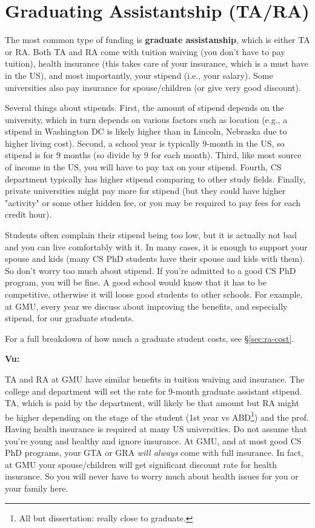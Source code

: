 \documentclass[oneside,11pt]{memoir}
\newenvironment{commentbox}[1][]{
\small
    \begin{mybox}
    {\small \textbf{#1}}
 }{
   \end{mybox}
}
\begin{document}
\section{Graduating Assistantship (TA/RA)}
The most common type of funding is \textbf{graduate assistanship}, which is either TA or RA. Both TA and RA come with tuition waiving (you don't have to pay tuition), health insurance (this takes care of your insurance, which is a must have in the US), and most importantly, your stipend (i.e., your salary). Some universities also pay insurance for spouse/children (or give very good discount).

Several things about stipends.  First, the amount of stipend depends on the university, which in turn depends on various factors such as location (e.g., a stipend in Washington DC is likely higher than in Lincoln, Nebraska due to higher living cost). Second, a school year is typically 9-month in the US, so stipend is for 9 months (so divide by 9 for each month). Third, like most source of income in the US, you will have to pay tax on your stipend.  Fourth, CS department typically has higher stipend comparing to other study fields.  Finally, private universities might pay more for stipend (but they could have higher "activity" or some other hidden fee, or you may be required to pay fees for each credit hour).

Students often complain their stipend being too low, but it is actually not bad and you can live comfortably with it.  In many cases, it is enough to support your spouse and kids (many CS PhD students have their spouse and kids with them). So don't worry too much about stipend.  If you're admitted to a good CS PhD program, you will be fine. A good school would know that it has to be competitive, otherwise it will loose good students to other schools.  For example, at GMU, every year we discuss about improving the benefits, and especially stipend, for our graduate students. 

For a full breakdown of how much a graduate student costs, see \S\ref{sec:ra-cost}.

\begin{commentbox}[Vu:]
TA and RA at GMU have similar benefits in tuition waiving and insurance.  The college and department will set the rate for 9-month graduate assistant stipend.  TA, which is paid by the department, will likely be that amount but RA might be higher depending on the stage of the student (1st year vs ABD\footnote{All but dissertation: really close to graduate.}) and the prof. 
\tcblower
Having health insurance is required at many US universities.  Do not assume that you're young and healthy and ignore insurance.  At GMU, and at most good CS PhD programs, your GTA or GRA \emph{will always} come with full insurance. In fact, at GMU your spouse/children will get significant discount rate for health insurance.  So you will never have to worry much about health issues for you or your family here.
\end{commentbox}
\end{document}
